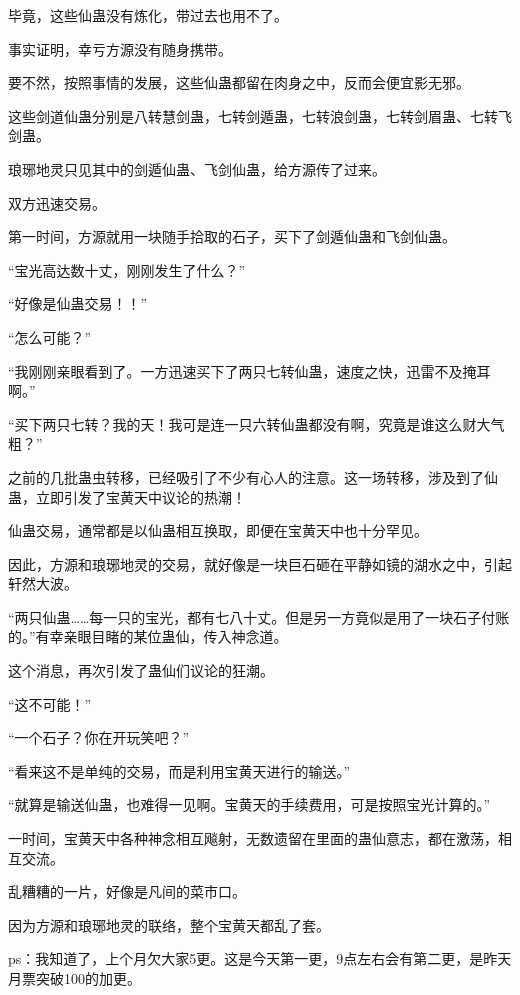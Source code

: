 \begin{this_body}
毕竟，这些仙蛊没有炼化，带过去也用不了。

事实证明，幸亏方源没有随身携带。

要不然，按照事情的发展，这些仙蛊都留在肉身之中，反而会便宜影无邪。

这些剑道仙蛊分别是八转慧剑蛊，七转剑遁蛊，七转浪剑蛊，七转剑眉蛊、七转飞剑蛊。

琅琊地灵只见其中的剑遁仙蛊、飞剑仙蛊，给方源传了过来。

双方迅速交易。

第一时间，方源就用一块随手拾取的石子，买下了剑遁仙蛊和飞剑仙蛊。

“宝光高达数十丈，刚刚发生了什么？”

“好像是仙蛊交易！！”

“怎么可能？”

“我刚刚亲眼看到了。一方迅速买下了两只七转仙蛊，速度之快，迅雷不及掩耳啊。”

“买下两只七转？我的天！我可是连一只六转仙蛊都没有啊，究竟是谁这么财大气粗？”

之前的几批蛊虫转移，已经吸引了不少有心人的注意。这一场转移，涉及到了仙蛊，立即引发了宝黄天中议论的热潮！

仙蛊交易，通常都是以仙蛊相互换取，即便在宝黄天中也十分罕见。

因此，方源和琅琊地灵的交易，就好像是一块巨石砸在平静如镜的湖水之中，引起轩然大波。

“两只仙蛊……每一只的宝光，都有七八十丈。但是另一方竟似是用了一块石子付账的。”有幸亲眼目睹的某位蛊仙，传入神念道。

这个消息，再次引发了蛊仙们议论的狂潮。

“这不可能！”

“一个石子？你在开玩笑吧？”

“看来这不是单纯的交易，而是利用宝黄天进行的输送。”

“就算是输送仙蛊，也难得一见啊。宝黄天的手续费用，可是按照宝光计算的。”

一时间，宝黄天中各种神念相互飚射，无数遗留在里面的蛊仙意志，都在激荡，相互交流。

乱糟糟的一片，好像是凡间的菜市口。

因为方源和琅琊地灵的联络，整个宝黄天都乱了套。

ps：我知道了，上个月欠大家5更。这是今天第一更，9点左右会有第二更，是昨天月票突破100的加更。

\end{this_body}

